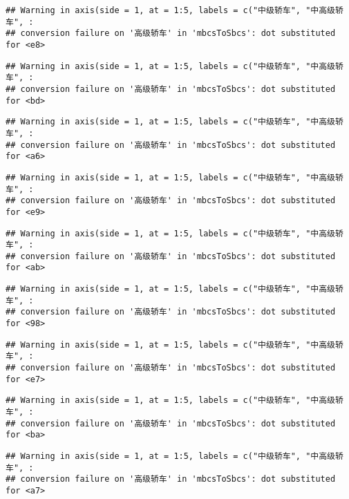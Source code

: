 \documentclass[]{article}
\begin{document}
\begin{verbatim}
## Warning in axis(side = 1, at = 1:5, labels = c("中级轿车", "中高级轿车", :
## conversion failure on '高级轿车' in 'mbcsToSbcs': dot substituted for <e8>
\end{verbatim}

\begin{verbatim}
## Warning in axis(side = 1, at = 1:5, labels = c("中级轿车", "中高级轿车", :
## conversion failure on '高级轿车' in 'mbcsToSbcs': dot substituted for <bd>
\end{verbatim}

\begin{verbatim}
## Warning in axis(side = 1, at = 1:5, labels = c("中级轿车", "中高级轿车", :
## conversion failure on '高级轿车' in 'mbcsToSbcs': dot substituted for <a6>
\end{verbatim}

\begin{verbatim}
## Warning in axis(side = 1, at = 1:5, labels = c("中级轿车", "中高级轿车", :
## conversion failure on '高级轿车' in 'mbcsToSbcs': dot substituted for <e9>
\end{verbatim}

\begin{verbatim}
## Warning in axis(side = 1, at = 1:5, labels = c("中级轿车", "中高级轿车", :
## conversion failure on '高级轿车' in 'mbcsToSbcs': dot substituted for <ab>
\end{verbatim}

\begin{verbatim}
## Warning in axis(side = 1, at = 1:5, labels = c("中级轿车", "中高级轿车", :
## conversion failure on '高级轿车' in 'mbcsToSbcs': dot substituted for <98>
\end{verbatim}

\begin{verbatim}
## Warning in axis(side = 1, at = 1:5, labels = c("中级轿车", "中高级轿车", :
## conversion failure on '高级轿车' in 'mbcsToSbcs': dot substituted for <e7>
\end{verbatim}

\begin{verbatim}
## Warning in axis(side = 1, at = 1:5, labels = c("中级轿车", "中高级轿车", :
## conversion failure on '高级轿车' in 'mbcsToSbcs': dot substituted for <ba>
\end{verbatim}

\begin{verbatim}
## Warning in axis(side = 1, at = 1:5, labels = c("中级轿车", "中高级轿车", :
## conversion failure on '高级轿车' in 'mbcsToSbcs': dot substituted for <a7>
\end{verbatim}
\end{document}

